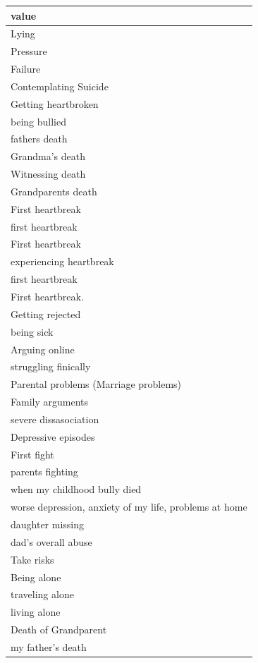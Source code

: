 \documentclass[
  .7em,
  letterpaper,
  DIV=11,
  numbers=noendperiod]{scrartcl}
\begin{document}
\begin{table}
\centering
\begin{tabular}{l}
\hline
value\\
\hline
Lying\\
\hline
Pressure\\
\hline
Failure\\
\hline
Contemplating Suicide\\
\hline
Getting heartbroken\\
\hline
being bullied\\
\hline
fathers death\\
\hline
Grandma's death\\
\hline
Witnessing death\\
\hline
Grandparents death\\
\hline
First heartbreak\\
\hline
first heartbreak\\
\hline
First heartbreak\\
\hline
experiencing heartbreak\\
\hline
first heartbreak\\
\hline
First heartbreak.\\
\hline
Getting rejected\\
\hline
being sick\\
\hline
Arguing online\\
\hline
struggling finically\\
\hline
Parental problems (Marriage problems)\\
\hline
Family arguments\\
\hline
severe dissasociation\\
\hline
Depressive episodes\\
\hline
First fight\\
\hline
parents fighting\\
\hline
when my childhood bully died\\
\hline
worse depression, anxiety of my life, problems at home\\
\hline
daughter missing\\
\hline
dad's overall abuse\\
\hline
Take risks\\
\hline
Being alone\\
\hline
traveling alone\\
\hline
living alone\\
\hline
Death of Grandparent\\
\hline
my father's death\\

\end{tabular}
\end{table}
\end{document}

